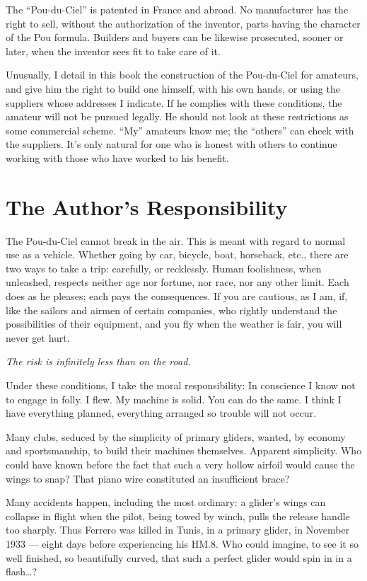 \documentclass{book}
\begin{document}
The ``Pou-du-Ciel'' is patented in France and abroad. No manufacturer
has the right to sell, without the authorization of the inventor,
parts having the character of the Pou formula. Builders and buyers can
be likewise prosecuted, sooner or later, when the inventor sees fit to
take care of it.

Unusually, I detail in this book the construction of the Pou-du-Ciel
for amateurs, and give him the right to build one himself, with his
own hands, or using the suppliers whose addresses I indicate. If he
complies with these conditions, the amateur will not be pursued
legally. He should not look at these restrictions as some commercial
scheme. ``My'' amateurs know me; the ``others'' can check with the
suppliers. It's only natural for one who is honest with others to
continue working with those who have worked to his benefit.

\section{The Author's Responsibility}

The Pou-du-Ciel cannot break in the air. This is meant with regard to
normal use as a vehicle. Whether going by car, bicycle, boat,
horseback, etc., there are two ways to take a trip: carefully, or
recklessly.  Human foolishness, when unleashed, respects neither age
nor fortune, nor race, nor any other limit. Each does as he pleases;
each pays the consequences.  If you are cautious, as I am, if, like
the sailors and airmen of certain companies, who rightly understand
the possibilities of their equipment, and you fly when the weather is
fair, you will never get hurt.

\textit{The risk is infinitely less than on the road.}

Under these conditions, I take the moral responsibility: In conscience
I know not to engage in folly. I flew. My machine is solid. You can do
the same. I think I have everything planned, everything arranged so
trouble will not occur.

Many clubs, seduced by the simplicity of primary gliders, wanted, by
economy and sportsmanship, to build their machines themselves.
Apparent simplicity. Who could have known before the fact that such a
very hollow airfoil would cause the wings to snap?  That piano wire
constituted an insufficient brace?

Many accidents happen, including the most ordinary: a glider's wings
can collapse in flight when the pilot, being towed by winch, pulls the
release handle too sharply.  Thus Ferrero was killed in Tunis, in a
primary glider, in November 1933 --- eight days before experiencing
his HM.8.  Who could imagine, to see it so well finished, so
beautifully curved, that such a perfect glider would spin in in a
flash\ldots?
\end{document}
